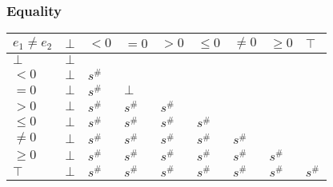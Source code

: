 \documentclass{beamer}
\begin{document}
\begin{frame}
    \frametitle{Equality}
\begin{table}
    \begin{tabular}{|l|l|l|l|l|l|l|l|l|}
    \hline
    $e_1 \ne e_2$ & $\bot$ & $<0$   & $=0$   & $>0$   & $\le 0$ & $\ne 0$ & $\ge 0$ & $\top$ \\ \hline
    $\bot$        & $\bot$ &        &        &        &         &         &         &        \\ \hline
    $<0$          & $\bot$ & $s^\#$ &        &        &         &         &         &        \\ \hline
    $=0$          & $\bot$ & $s^\#$ & $\bot$ &        &         &         &         &        \\ \hline
    $>0$          & $\bot$ & $s^\#$ & $s^\#$ & $s^\#$ &         &         &         &        \\ \hline
    $\le 0$       & $\bot$ & $s^\#$ & $s^\#$ & $s^\#$ & $s^\#$  &         &         &        \\ \hline
    $\ne 0$       & $\bot$ & $s^\#$ & $s^\#$ & $s^\#$ & $s^\#$  & $s^\#$  &         &        \\ \hline
    $\ge 0$       & $\bot$ & $s^\#$ & $s^\#$ & $s^\#$ & $s^\#$  & $s^\#$  & $s^\#$  &        \\ \hline
    $\top$        & $\bot$ & $s^\#$ & $s^\#$ & $s^\#$ & $s^\#$  & $s^\#$  & $s^\#$  & $s^\#$ \\ \hline
    \end{tabular}
    \end{table}
\end{frame}
\end{document}
